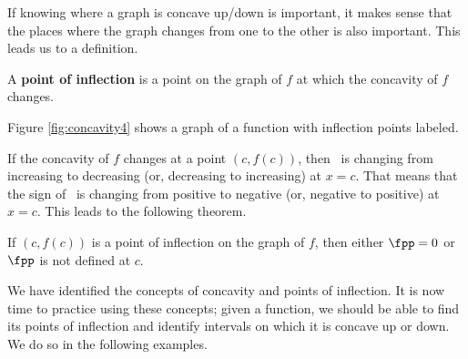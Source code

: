 %
%
%



If knowing where a graph is concave up/down is important, it makes sense that the places where the graph changes from one to the other is also important. This leads us to a definition.

{A \textbf{point of inflection} is a point on the graph of $f$ at which the concavity of $f$ changes.
}

Figure \ref{fig:concavity4} shows a graph of a function with inflection points labeled.


If the concavity of $f$ changes at a point $(c,f(c))$, then \fp\ is changing from increasing to decreasing (or, decreasing to increasing) at $x=c$. That means that the sign of \fpp\ is changing from positive to negative (or, negative to positive) at $x=c$.  This leads to the following theorem.

{If $(c,f(c))$ is a point of inflection on the graph of $f$, then either $\fpp=0$ or $\fpp$ is not defined at $c$.}

We have identified the concepts of concavity and points of inflection. It is now time to practice using these concepts; given a function, we should be able to find its points of inflection and identify intervals on which it is concave up or down. We do so in the following examples.\\


